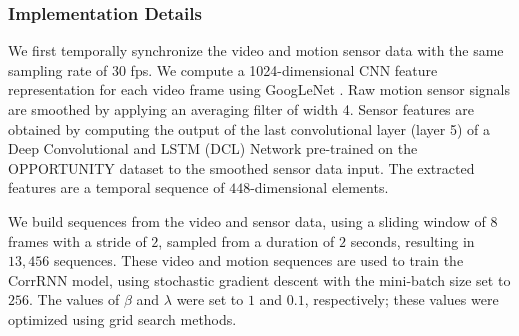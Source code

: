 \documentclass[10pt,twocolumn,letterpaper]{article}
\begin{document}
\subsubsection{Implementation Details}
We first temporally synchronize the video and motion sensor data with the same sampling rate of 30 fps. We compute a 1024-dimensional CNN feature representation for each video frame using GoogLeNet \cite{szegedy2015going}. Raw motion sensor signals are smoothed by applying an averaging filter of width 4. Sensor features are obtained by computing the output of the last convolutional layer (layer 5) of a Deep Convolutional and LSTM (DCL) Network \cite{ordonez2016deep} pre-trained on the OPPORTUNITY dataset \cite{roggen2010collecting} to the smoothed sensor data input. The extracted features are a temporal sequence of $448$-dimensional elements. 


We build sequences from the video and sensor data, using a sliding window of 8 frames with a stride of $2$, sampled from a duration of $2$ seconds, resulting in $13,456$ sequences. 
These video and motion sequences are used to train the CorrRNN model, using stochastic gradient descent with the mini-batch size set to $256$. The values of $\beta$ and $\lambda$ were set to $1$ and $0.1$, respectively; these values were optimized using grid search methods. %
%
%
%

\end{document}
